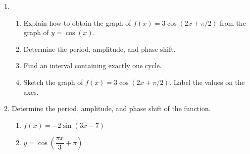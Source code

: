 \begin{enumerate}
\clearpage

\item \begin{enumerate} \item Explain how to obtain the graph of $f(x)=3\cos(2x+\pi/2)$ from the graph of $y=\cos(x)$. \\[.75in]

\item Determine the period, amplitude, and phase shift.\\[1.5in]

\item Find an interval containing exactly one cycle.\vfill

\item Sketch the graph of $f(x)=3\cos(2x+\pi/2)$. Label the values on the axes.

    \noindent

\end{enumerate} 



\clearpage



\item Determine the period, amplitude, and phase shift of the function. \begin{enumerate}
\item $f(x)= -2 \sin(3x-7)$ \\[1in] 
\item $y = \cos\left(\dfrac{\pi x}{3}+\pi\right)$ \\[1in]
\end{enumerate}



\end{enumerate}
